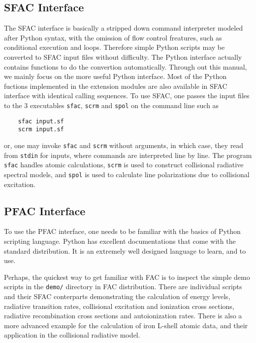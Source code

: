 \documentclass[twoside,letterpaper]{refrep}
\begin{document}
\subsection{SFAC Interface}
The SFAC interface is basically a stripped down command interpreter modeled
after Python syntax, with the omission of flow control freatures, such as
conditional execution and loops. Therefore simple Python scripts may be
converted to SFAC input files without difficulty. The Python interface
actually contains functions to do the convertion automatically. Through out
this manual, we mainly focus on the more useful Python interface. Most of the
Python fuctions implemented in the extension modules are also available in
SFAC interface with identical calling sequences. To use SFAC, one passes the
input files to the 3 executables \verb|sfac|, \verb|scrm| and \verb|spol| on
the command line such as 
\begin{verbatim}
    sfac input.sf
    scrm input.sf
\end{verbatim}
or, one may invoke \verb|sfac| and \verb|scrm| without arguments, in which
case, they read from \verb|stdin| for inputs, where commands are interpreted
line by line. The program \verb|sfac| handles atomic calculations,
\verb|scrm| is used to construct collisional radiative spectral models, and 
\verb|spol| is used to calculate line polarizations due to collisional
excitation. 

\subsection{PFAC Interface}
To use the PFAC interface, one needs to be familiar with the basics of Python
scripting language. Python has excellent documentations that come with the standard
distribution. It is an extremely well designed language to learn, and to use.

Perhaps, the quickest way to get familiar with FAC is to inspect the simple
demo scripts in the \verb|demo/| directory in FAC distribution. There
are individual scripts and their SFAC conterparts demonstrating the
calculation of energy levels, radiative transition rates, collisional
excitation and ionization cross sections, radiative recombination cross
sections and autoionization rates. There is also a more advanced example for
the calculation of iron L-shell atomic data, and their application in the
collisional radiative model.
\end{document}
